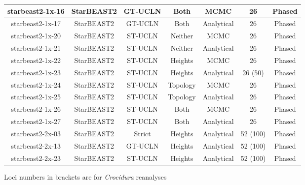 \documentclass[12pt]{article}
\begin{document}
\begin{table}[htb!]
\begin{threeparttable}
\begin{adjustbox}{center}
\begin{tabular}{|c|c|c|c|c|c|c|}
\hline
starbeast2-1x-16 & StarBEAST2 & GT-UCLN & Both & MCMC & 26 & Phased\tabularnewline
\hline
starbeast2-1x-17 & StarBEAST2 & GT-UCLN & Both & Analytical & 26 & Phased\tabularnewline
\hline
starbeast2-1x-20 & StarBEAST2 & ST-UCLN & Neither & MCMC & 26 & Phased\tabularnewline
\hline
starbeast2-1x-21 & StarBEAST2 & ST-UCLN & Neither & Analytical & 26 & Phased\tabularnewline
\hline
starbeast2-1x-22 & StarBEAST2 & ST-UCLN & Heights & MCMC & 26 & Phased\tabularnewline
\hline
starbeast2-1x-23 & StarBEAST2 & ST-UCLN & Heights & Analytical & 26 (50) & Phased\tabularnewline
\hline
starbeast2-1x-24 & StarBEAST2 & ST-UCLN & Topology & MCMC & 26 & Phased\tabularnewline
\hline
starbeast2-1x-25 & StarBEAST2 & ST-UCLN & Topology & Analytical & 26 & Phased\tabularnewline
\hline
starbeast2-1x-26 & StarBEAST2 & ST-UCLN & Both & MCMC & 26 & Phased\tabularnewline
\hline
starbeast2-1x-27 & StarBEAST2 & ST-UCLN & Both & Analytical & 26 & Phased\tabularnewline
\hline
starbeast2-2x-03 & StarBEAST2 & Strict & Heights & Analytical & 52 (100) & Phased\tabularnewline
\hline
starbeast2-2x-13 & StarBEAST2 & GT-UCLN & Heights & Analytical & 52 (100) & Phased\tabularnewline
\hline
starbeast2-2x-23 & StarBEAST2 & ST-UCLN & Heights & Analytical & 52 (100) & Phased\tabularnewline
\hline
\end{tabular}
\end{adjustbox}
\begin{tablenotes}
\item Loci numbers in brackets are for \textit{Crocidura} reanalyses
\end{tablenotes}
\end{threeparttable}
\end{table}
\end{document}
